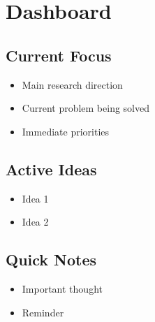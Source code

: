 \section{Dashboard}

\subsection{Current Focus}
\begin{itemize}
    \item Main research direction
    \item Current problem being solved
    \item Immediate priorities
\end{itemize}

\subsection{Active Ideas}
\begin{itemize}
    \item Idea 1
    \item Idea 2
\end{itemize}

\subsection{Quick Notes}
\begin{itemize}
    \item Important thought
    \item Reminder
\end{itemize}